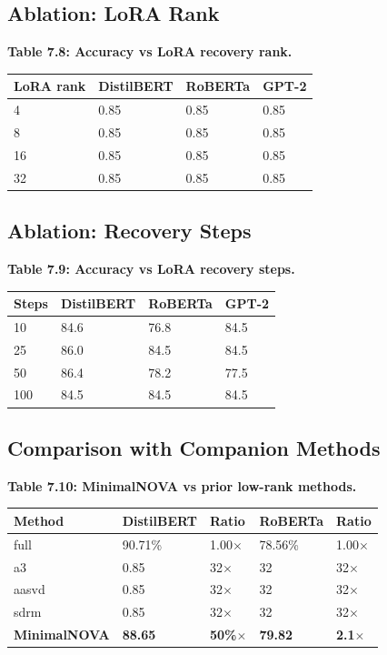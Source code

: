 \subsection{Ablation: LoRA Rank}

\textbf{Table 7.8: Accuracy vs LoRA recovery rank.}

\begin{table}[H]
\centering
\small
\begin{tabular}{llll}
\toprule
\textbf{LoRA rank} & \textbf{DistilBERT} & \textbf{RoBERTa} & \textbf{GPT-2} \\
\midrule
4 & 0.85 & 0.85 & 0.85 \\
8 & 0.85 & 0.85 & 0.85 \\
16 & 0.85 & 0.85 & 0.85 \\
32 & 0.85 & 0.85 & 0.85 \\
\bottomrule
\end{tabular}
\end{table}

\subsection{Ablation: Recovery Steps}

\textbf{Table 7.9: Accuracy vs LoRA recovery steps.}

\begin{table}[H]
\centering
\small
\begin{tabular}{llll}
\toprule
\textbf{Steps} & \textbf{DistilBERT} & \textbf{RoBERTa} & \textbf{GPT-2} \\
\midrule
10 & 84.6 & 76.8 & 84.5 \\
25 & 86.0 & 84.5 & 84.5 \\
50 & 86.4 & 78.2 & 77.5 \\
100 & 84.5 & 84.5 & 84.5 \\
\bottomrule
\end{tabular}
\end{table}

\subsection{Comparison with Companion Methods}

\textbf{Table 7.10: MinimalNOVA vs prior low-rank methods.}

\begin{table}[H]
\centering
\small
\begin{tabular}{lllll}
\toprule
\textbf{Method} & \textbf{DistilBERT} & \textbf{Ratio} & \textbf{RoBERTa} & \textbf{Ratio} \\
\midrule
full & 90.71\% & 1.00$\times$ & 78.56\% & 1.00$\times$ \\
a3 & 0.85 & 32$\times$ & 32 & 32$\times$ \\
aasvd & 0.85 & 32$\times$ & 32 & 32$\times$ \\
sdrm & 0.85 & 32$\times$ & 32 & 32$\times$ \\
\textbf{MinimalNOVA} & \textbf{88.65} & \textbf{50\%$\times$} & \textbf{79.82} & \textbf{2.1$\times$} \\
\bottomrule
\end{tabular}
\end{table}

